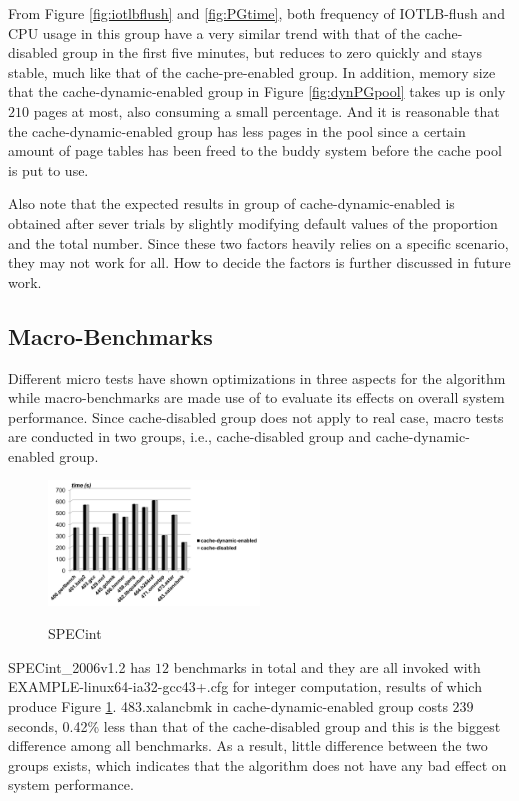 From Figure \ref{fig:iotlbflush} and \ref{fig:PGtime}, both frequency of IOTLB-flush and CPU usage in this group have a very similar trend with that of the cache-disabled group in the first five minutes, but reduces to zero quickly and stays stable, much like that of the cache-pre-enabled group. In addition, memory size that the cache-dynamic-enabled group in Figure \ref{fig:dynPGpool} takes up is only $210$ pages at most, also consuming a small percentage. And it is reasonable that the cache-dynamic-enabled group has less pages in the pool since a certain amount of page tables has been freed to the buddy system before the cache pool is put to use.

Also note that the expected results in group of cache-dynamic-enabled is obtained after sever trials by slightly modifying default values of the proportion and the total number. Since these two factors heavily relies on a specific scenario, they may not work for all. How to decide the factors is further discussed in future work.

\subsection{Macro-Benchmarks}

Different micro tests have shown optimizations in three aspects for the algorithm while macro-benchmarks are made use of to evaluate its effects on overall system performance. Since cache-disabled group does not apply to real case, macro tests are conducted in two groups, i.e., cache-disabled group and cache-dynamic-enabled group.

\begin{figure}[ht]
\centering
\includegraphics[width=0.5\textwidth]{image/macro/spec.png} \\
\caption{SPECint}
\label{fig:spec}
\end{figure}

SPECint\_2006v1.2 has $12$ benchmarks in total and they are all invoked with EXAMPLE-linux64-ia32-gcc43+.cfg for integer computation, results of which produce Figure \ref{fig:spec}. 483.xalancbmk in cache-dynamic-enabled group costs $239$ seconds, 0.42\% less 
than that of the cache-disabled group and this is the biggest difference among all benchmarks. As a result, little difference between the two groups exists, which indicates that the algorithm does not have any bad effect on system performance.

